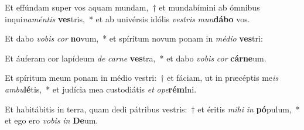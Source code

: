 \item Et effúndam super vos aquam mundam,~† et mundabímini ab ómnibus inqui\textit{na}\textit{mén}\textit{tis} \textbf{ves}tris,~* et ab univérsis idólis \textit{ves}\textit{tris} \textit{mun}\textbf{dá}\textbf{bo} vos.
\item Et dabo \textit{vo}\textit{bis} \textit{cor} \textbf{no}vum,~* et spíritum novum ponam in \textit{mé}\textit{di}\textit{o} \textbf{ves}tri:
\item Et áuferam cor lapídeum \textit{de} \textit{car}\textit{ne} \textbf{ves}tra,~* et dabo \textit{vo}\textit{bis} \textit{cor} \textbf{cár}\textbf{ne}um.
\item Et spíritum meum ponam in médio vestri:~† et fáciam, ut in præcéptis me\textit{is} \textit{am}\textit{bu}\textbf{lé}tis,~* et judícia mea custodiátis \textit{et} \textit{o}\textit{pe}\textbf{ré}\textbf{mi}ni.
\item Et habitábitis in terra, quam dedi pátribus vestris:~† et éritis \textit{mi}\textit{hi} \textit{in} \textbf{pó}pulum,~* et ego ero \textit{vo}\textit{bis} \textit{in} \textbf{De}um.
